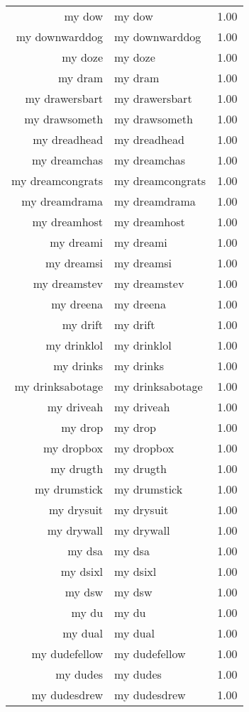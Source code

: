 \begin{table}[ht]
\begin{tabular}{rlr}
  my dow & my dow & 1.00 \\ 
  my downwarddog & my downwarddog & 1.00 \\ 
  my doze & my doze & 1.00 \\ 
  my dram & my dram & 1.00 \\ 
  my drawersbart & my drawersbart & 1.00 \\ 
  my drawsometh & my drawsometh & 1.00 \\ 
  my dreadhead & my dreadhead & 1.00 \\ 
  my dreamchas & my dreamchas & 1.00 \\ 
  my dreamcongrats & my dreamcongrats & 1.00 \\ 
  my dreamdrama & my dreamdrama & 1.00 \\ 
  my dreamhost & my dreamhost & 1.00 \\ 
  my dreami & my dreami & 1.00 \\ 
  my dreamsi & my dreamsi & 1.00 \\ 
  my dreamstev & my dreamstev & 1.00 \\ 
  my dreena & my dreena & 1.00 \\ 
  my drift & my drift & 1.00 \\ 
  my drinklol & my drinklol & 1.00 \\ 
  my drinks & my drinks & 1.00 \\ 
  my drinksabotage & my drinksabotage & 1.00 \\ 
  my driveah & my driveah & 1.00 \\ 
  my drop & my drop & 1.00 \\ 
  my dropbox & my dropbox & 1.00 \\ 
  my drugth & my drugth & 1.00 \\ 
  my drumstick & my drumstick & 1.00 \\ 
  my drysuit & my drysuit & 1.00 \\ 
  my drywall & my drywall & 1.00 \\ 
  my dsa & my dsa & 1.00 \\ 
  my dsixl & my dsixl & 1.00 \\ 
  my dsw & my dsw & 1.00 \\ 
  my du & my du & 1.00 \\ 
  my dual & my dual & 1.00 \\ 
  my dudefellow & my dudefellow & 1.00 \\ 
  my dudes & my dudes & 1.00 \\ 
  my dudesdrew & my dudesdrew & 1.00 \\ 

\end{tabular}
\end{table}
